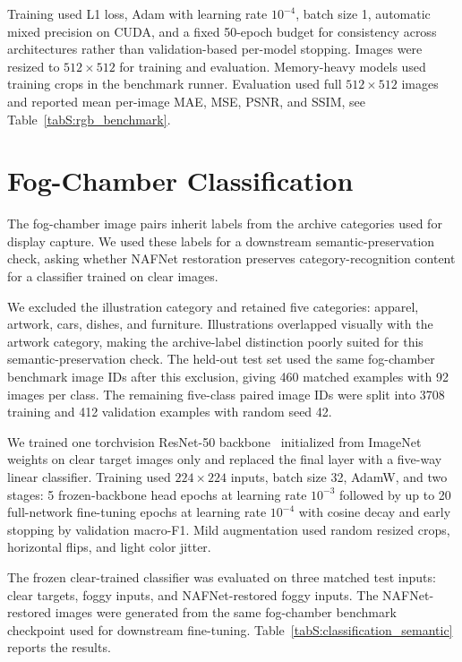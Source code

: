 \documentclass[9pt]{osa-supplemental-document}
\begin{document}
Training used L1 loss, Adam with learning rate $10^{-4}$, batch size 1, automatic mixed precision on CUDA, and a fixed 50-epoch budget for consistency across architectures rather than validation-based per-model stopping. Images were resized to $512 \times 512$ for training and evaluation. Memory-heavy models used training crops in the benchmark runner. Evaluation used full $512 \times 512$ images and reported mean per-image MAE, MSE, PSNR, and SSIM, see Table~\ref{tabS:rgb_benchmark}.


\FloatBarrier


\section{Fog-Chamber Classification}

The fog-chamber image pairs inherit labels from the archive categories used for display capture. We used these labels for a downstream semantic-preservation check, asking whether NAFNet restoration preserves category-recognition content for a classifier trained on clear images.

We excluded the illustration category and retained five categories: apparel, artwork, cars, dishes, and furniture. Illustrations overlapped visually with the artwork category, making the archive-label distinction poorly suited for this semantic-preservation check. The held-out test set used the same fog-chamber benchmark image IDs after this exclusion, giving 460 matched examples with 92 images per class. The remaining five-class paired image IDs were split into 3708 training and 412 validation examples with random seed 42.

We trained one torchvision ResNet-50 backbone~\cite{he2016deep} initialized from ImageNet weights on clear target images only and replaced the final layer with a five-way linear classifier. Training used $224 \times 224$ inputs, batch size 32, AdamW, and two stages: 5 frozen-backbone head epochs at learning rate $10^{-3}$ followed by up to 20 full-network fine-tuning epochs at learning rate $10^{-4}$ with cosine decay and early stopping by validation macro-F1. Mild augmentation used random resized crops, horizontal flips, and light color jitter.

The frozen clear-trained classifier was evaluated on three matched test inputs: clear targets, foggy inputs, and NAFNet-restored foggy inputs. The NAFNet-restored images were generated from the same fog-chamber benchmark checkpoint used for downstream fine-tuning. Table~\ref{tabS:classification_semantic} reports the results.
\end{document}
